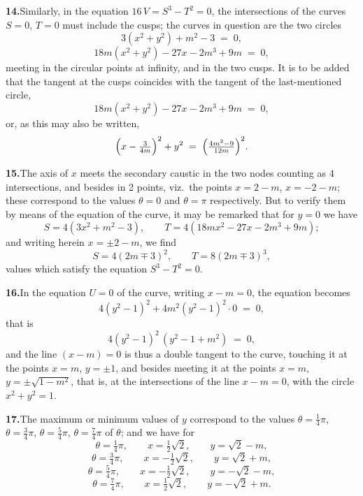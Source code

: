 \documentclass[11pt]{article}
\begin{document}
\textbf{14.}\quad Similarly, in the equation $16\,V = S^{3} - T^{2} = 0$, the intersections of the curves $S = 0$, $T = 0$ must include the cusps; the curves in question are the two circles
\[
3(x^{2} + y^{2}) + m^{2} - 3 \;=\; 0,
\]
\[
18 m(x^{2} + y^{2}) - 27 x - 2 m^{3} + 9 m \;=\; 0,
\]
meeting in the circular points at infinity, and in the two cusps. It is to be added that the tangent at the cusps coincides with the tangent of the last-mentioned circle,
\[
18 m(x^{2} + y^{2}) - 27 x - 2 m^{3} + 9 m \;=\; 0,
\]
or, as this may also be written,
\[
\Bigl(x - \tfrac{3}{4 m}\Bigr)^{2} + y^{2} \;=\; \Bigl(\tfrac{4 m^{2} - 9}{12 m}\Bigr)^{2}.
\]

\textbf{15.}\quad The axis of $x$ meets the secondary caustic in the two nodes counting as 4 intersections, and besides in 2 points, viz.\ the points $x = 2 - m$, $x = -2 - m$; these correspond to the values $\theta = 0$ and $\theta = \pi$ respectively. But to verify them by means of the equation of the curve, it may be remarked that for $y = 0$ we have
\[
S = 4(3 x^{2} + m^{2} - 3),\qquad T = 4(18 m x^{2} - 27 x - 2 m^{3} + 9 m);
\]
and writing herein $x = \pm 2 - m$, we find
\[
S = 4(2 m \mp 3)^{2},\qquad T = 8(2 m \mp 3)^{3},
\]
values which satisfy the equation $S^{3} - T^{2} = 0$.

\textbf{16.}\quad In the equation $U = 0$ of the curve, writing $x - m = 0$, the equation becomes
\[
4(y^{2} - 1)^{2} + 4 m^{2}(y^{2} - 1)^{2}\cdot 0 \;=\; 0,
\]
that is
\[
4(y^{2} - 1)^{2}\,(y^{2} - 1 + m^{2}) \;=\; 0,
\]
and the line $(x - m) = 0$ is thus a double tangent to the curve, touching it at the points $x = m$, $y = \pm 1$, and besides meeting it at the points $x = m$, $y = \pm\sqrt{1 - m^{2}}$, that is, at the intersections of the line $x - m = 0$, with the circle $x^{2} + y^{2} = 1$.

\textbf{17.}\quad The maximum or minimum values of $y$ correspond to the values $\theta = \tfrac{1}{4}\pi$, $\theta = \tfrac{3}{4}\pi$, $\theta = \tfrac{5}{4}\pi$, $\theta = \tfrac{7}{4}\pi$ of $\theta$; and we have for
\[
\theta = \tfrac{1}{4}\pi,\qquad x = \tfrac{1}{2}\sqrt{2},\qquad y = \sqrt{2} - m,
\]
\[
\theta = \tfrac{3}{4}\pi,\qquad x = -\tfrac{1}{2}\sqrt{2},\qquad y = \sqrt{2} + m,
\]
\[
\theta = \tfrac{5}{4}\pi,\qquad x = -\tfrac{1}{2}\sqrt{2},\qquad y = -\sqrt{2} - m,
\]
\[
\theta = \tfrac{7}{4}\pi,\qquad x = \tfrac{1}{2}\sqrt{2},\qquad y = -\sqrt{2} + m.
\]
\end{document}
